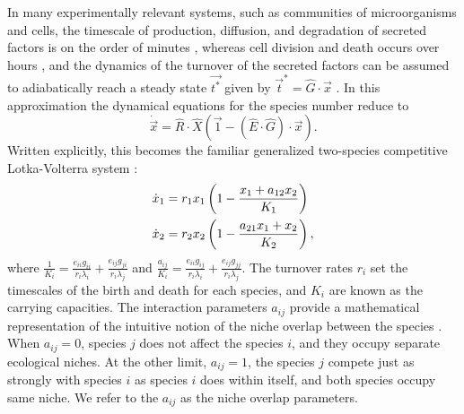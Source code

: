In many experimentally relevant systems, such as communities of microorganisms and cells, the timescale of production, diffusion, and degradation of secreted factors is on the order of minutes \cite{Belle2006}, whereas cell division and death occurs over hours \cite{Powell1956,Lenski1991}, and the dynamics of the turnover of the secreted factors can be assumed to adiabatically reach a steady state $\vec{t^*}$ given by $\vec{t}^* = \hat{G}\cdot \vec{x}$ \cite{Posfai2017,Assaf2016,Chotibut2017a}. In this approximation the dynamical equations for the species number reduce to
\begin{equation}
\dot{\vec{x}} = \hat{R}\cdot\hat{X} \left( \vec{1} - (\hat{E}\cdot\hat{G})\cdot\vec{x} \right).
\end{equation}\label{eq-xdot-adiabatic}
Written explicitly, this becomes the familiar generalized two-species competitive Lotka-Volterra system \cite{Chotibut2015,MacArthur1970,Dobrinevski2012,Constable2015,Bomze1983,Levin1970,Czuppon2017,Young2018}:
\begin{align}
\dot{x}_1 &= r_1 x_1 \left( 1 - \frac{x_1 + a_{12} x_2}{K_1} \right) \notag \\
\dot{x}_2 &= r_2 x_2 \left( 1 - \frac{a_{21} x_1 + x_2}{K_2} \right), \label{mean-field-eqns}
\end{align}
where $\frac{1}{K_i} = \frac{e_{ii} g_{ii}}{r_i \lambda_i} + \frac{e_{ij} g_{ji}}{r_i \lambda_j}$ and $\frac{a_{ij}}{K_i} = \frac{e_{ii} g_{ij}}{r_i \lambda_i} + \frac{e_{ij} g_{jj}}{r_i \lambda_j}$. %
The turnover rates $r_i$ set the timescales of the birth and death for each species, and $K_i$ are known as the carrying capacities. The interaction parameters $a_{ij}$  provide a mathematical representation of the intuitive notion of the niche overlap between the species \cite{MacArthur1967,Abrams1980,Schoener1985,Chesson2008}. When $a_{ij}=0$, species $j$ does not affect the species $i$, and they occupy separate ecological niches. At the other limit, $a_{ij}=1$, the species $j$ compete just as strongly with species $i$ as species $i$ does within itself, and both species occupy same niche. We refer to the $a_{ij}$ as the niche overlap parameters.

